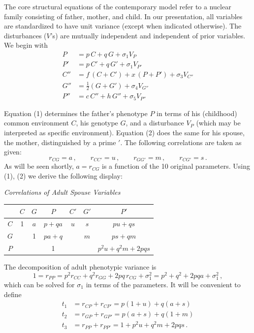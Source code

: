 ﻿\documentclass[12pt]{article}
\begin{document}
The core structural equations of the contemporary model refer to a nuclear family consisting of father, mother, and child. In our presentation, all variables are standardized to have unit variance (except when indicated otherwise). The disturbances ($V$'s) are mutually independent and independent of prior variables. We begin with
\begin{align}
P &= p\,C + q\,G + \sigma_1 V_P \\
P' &= p\,C' + q\,G' + \sigma_1 V_{P'} \\
C'' &= f\,(C+C') + x\,(P+P') + \sigma_3 V_{C''} \\
G'' &= \tfrac{1}{2}(G+G') + \sigma_4 V_{G''} \\
P'' &= c\,C'' + h\,G'' + \sigma_5 V_{P''}
\end{align}

Equation (1) determines the father's phenotype $P$ in terms of his (childhood) common environment $C$, his genotype $G$, and a disturbance $V_P$ (which may be interpreted as specific environment). Equation (2) does the same for his spouse, the mother, distinguished by a prime $'$. The following correlations are taken as given:
\begin{equation*}
r_{CG} = a \, , \qquad r_{CC'} = u \, , \qquad r_{GG'} = m \, , \qquad r_{CG'} = s \, .
\end{equation*}
As will be seen shortly, $a = r_{CG}$ is a function of the 10 original parameters. Using (1), (2) we derive the following display:

\begin{center}
\emph{Correlations of Adult Spouse Variables}
\end{center}
\begin{center}
\begin{tabular}{c|c c c c c c}
 & $C$ & $G$ & $P$ & $C'$ & $G'$ & $P'$ \\
\hline
$C$ & 1 & $a$ & $p+qa$ & $u$ & $s$ & $pu+qs$ \\
$G$ & & 1 & $pa+q$ & & $m$ & $ps+qm$ \\
$P$ & & & 1 & & & $p^2u+q^2m+2pqs$ \\
\end{tabular}
\end{center}

The decomposition of adult phenotypic variance is
\begin{equation*}
1 = r_{PP} = p^2 r_{CC} + q^2 r_{GG} + 2pq\,r_{CG} + \sigma_1^2 = p^2 + q^2 + 2pqa + \sigma_1^2 \, ,
\end{equation*}
which can be solved for $\sigma_1$ in terms of the parameters. It will be convenient to define
\begin{align*}
t_1 &= r_{CP} + r_{CP'} = p(1+u) + q(a+s) \\
t_2 &= r_{GP} + r_{GP'} = p(a+s) + q(1+m) \\
t_3 &= r_{PP} + r_{PP'} = 1 + p^2 u + q^2 m + 2pqs \, .
\end{align*}
\end{document}
